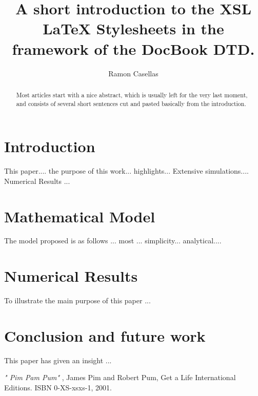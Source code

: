 \documentclass[english,a4]{article}
\title{A short introduction to the XSL LaTeX Stylesheets in the framework of the DocBook DTD.}
\author{Ramon Casellas}
\begin{document}
\maketitle

\begin{abstract}

 Most articles start with a nice abstract, which is usually left for 
the very last moment, and consists of several short sentences cut and
pasted basically from the introduction.  
\end{abstract}


\section{Introduction}
\label{N400015}\hypertarget{N400015}{}%

 This paper.... the purpose of this work... highlights...
Extensive simulations.... Numerical Results ...


\section{Mathematical Model}
\label{N40001A}\hypertarget{N40001A}{}%

 The model proposed is as follows ... most ... simplicity...
analytical....


\section{Numerical Results}
\label{N40001F}\hypertarget{N40001F}{}%

 To illustrate the main purpose of this paper ... 

\section{Conclusion and future work}
\label{N400024}\hypertarget{N400024}{}%

This paper has given an insight ... 
%	
%	

\begin{thebibliography}{WIDELABEL}

\emph{" Pim Pam Pum"} , James Pim and Robert Pum, Get a Life International Editions. ISBN 0-XS-xsxs-1, 2001. \label{PimPum}


\end{thebibliography}

\end{document}
